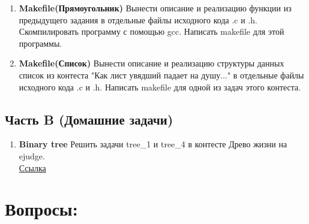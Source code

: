 \documentclass[12pt]{article}
\begin{document}
\begin{enumerate}
\item \textbf{Makefile(Прямоугольник)} Вынести описание и реализацию функции из предыдущего задания в отдельные файлы исходного кода .c и .h. Скомпилировать программу с помощью gcc. Написать makefile для этой программы.

\item \textbf{Makefile(Список)} Вынести описание и реализацию структуры данных список из контеста "Как лист увядший падает на душу..." в отдельные файлы исходного кода .c и .h. Написать makefile для одной из задач этого контеста.

\end{enumerate}

\subsection*{Часть B (Домашние задачи)}
\begin{enumerate}
\item \textbf{Binary tree} Решить задачи tree\_1 и tree\_4 в контесте Древо жизни на ejudge.\\
\href{http://93.175.29.68/cgi-bin/new-register?action=211&contest_id=500111}{Ссылка}
\end{enumerate}


\iffalse
\section*{Вопросы:}
\end{document}
